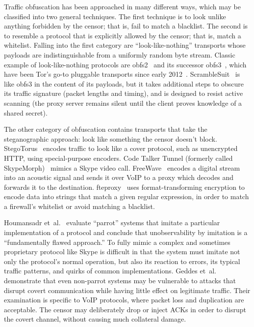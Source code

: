 \documentclass{article}
\begin{document}
Traffic obfuscation has been approached in many different ways,
which may be classified into two general techniques.
The first technique is to look unlike
anything forbidden by the censor; that is, fail to match a blacklist. The second is
to resemble a protocol that is explicitly allowed by the censor; that is, match a whitelist.
Falling into the first category are ``look-like-nothing'' transports whose
payloads are indistinguishable from a uniformly random byte stream.
Classic example of look-like-nothing
protocols are obfs2~\cite{obfs2} and its successor obfs3~\cite{obfs3},
which have been Tor's go-to pluggable transports since early 2012~\cite{obfsproxy-arms-race}.
ScrambleSuit~\cite{scramblesuit} is like obfs3 in the
content of its payloads, but it takes additional steps to obscure its traffic signature
(packet lengths and timing), and is designed to resist active scanning
(the proxy server remains silent until the client proves knowledge of a shared
secret).

The other category of obfuscation contains transports that take the steganographic approach: look like
something the censor doesn't block. StegoTorus~\cite{stegotorus}
encodes traffic to look like a cover protocol, such as unencrypted HTTP,
using special-purpose encoders.
Code Talker
Tunnel (formerly called SkypeMorph)~\cite{skypemorph} mimics a Skype video call.
FreeWave~\cite{freewave} encodes a digital stream into an acoustic signal
and sends it over VoIP to a proxy which decodes and forwards it to the destination.
fteproxy~\cite{fte} uses format-transforming encryption to encode data into strings that match a given regular expression,
in order to match a firewall's whitelist or avoid matching a blacklist.

Houmansadr et~al.~\cite{parrot} evaluate ``parrot'' systems that imitate a particular implementation of a protocol
and conclude that unobservability by imitation is a ``fundamentally
flawed approach.''
To fully mimic a complex and sometimes proprietary protocol like Skype
is difficult in that the system must imitate not only the protocol's normal operation, but also its reaction to errors,
its typical traffic patterns, and quirks of common implementations.
Geddes et~al.~\cite{acks}
demonstrate that even non-parrot systems may be vulnerable to
attacks that disrupt covert communication while having little effect
on legitimate traffic. Their examination is specific to VoIP protocols,
where packet loss and duplication are acceptable. The censor may
deliberately drop or inject ACKs in order to disrupt the covert channel, without causing
much collateral damage.
\end{document}
